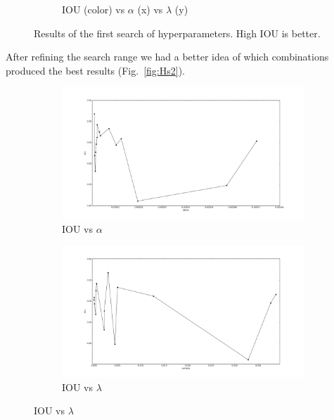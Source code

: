 \begin{figure}[h]
\begin{subfigure}{0.32\textwidth}
         \caption{IOU (color) vs $\alpha$ (x) vs $\lambda$ (y)}
	\end{subfigure}
	\caption[First hyperparameter search for Experiment 1]{Results of the first search of hyperparameters. High IOU is better.}
	 \label{fig:Hs1}
\end{figure}

After refining the search range we had a better idea of which combinations produced the best results (Fig.~\ref{fig:Hs2}).
\begin{figure}[h]
	\centering
	\begin{subfigure}{0.32\textwidth}
		\centering
                \includegraphics[width=\textwidth]{plots/hs2_alpha.png}
         \caption{IOU vs $\alpha$}
	\end{subfigure}
	\begin{subfigure}{0.32\textwidth}
		\centering
                \includegraphics[width=\textwidth]{plots/hs2_lambda.png}
         \caption{IOU vs $\lambda$}
	\end{subfigure}

\end{figure}
